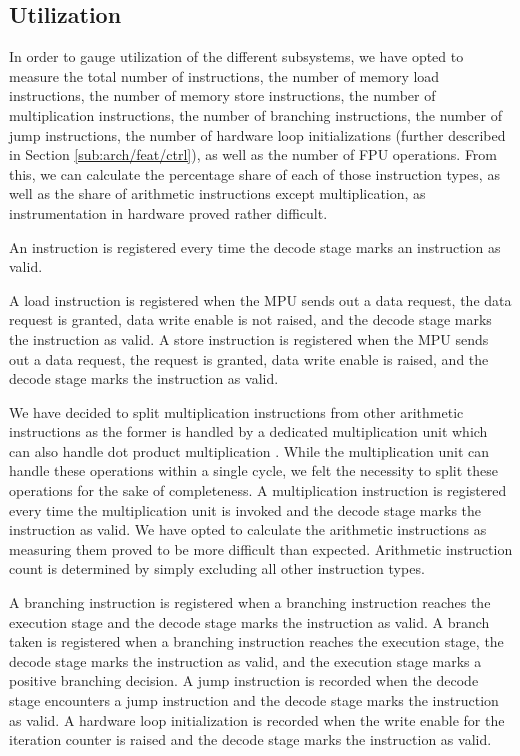\documentclass[../bachelor_paper.tex]{subfiles}
\begin{document}
\subsection{Utilization}
    \label{sub:arch/feat/ut}
In order to gauge utilization of the different subsystems, we have opted to measure the total number of instructions, the number of memory load instructions, the number of memory store instructions, the number of multiplication instructions, the number of branching instructions, the number of jump instructions, the number of hardware loop initializations (further described in Section \ref{sub:arch/feat/ctrl}), as well as the number of \ac{FPU} operations. From this, we can calculate the percentage share of each of those instruction types, as well as the share of arithmetic instructions except multiplication, as instrumentation in hardware proved rather difficult.

An instruction is registered every time the decode stage marks an instruction as valid.

A load instruction is registered when the \ac{MPU} sends out a data request, the data request is granted, data write enable is not raised, and the decode stage marks the instruction as valid. A store instruction is registered when the \ac{MPU} sends out a data request, the request is granted, data write enable is raised, and the decode stage marks the instruction as valid.

We have decided to split multiplication instructions from other arithmetic instructions as the former is handled by a dedicated multiplication unit which can also handle dot product multiplication \cite{gautschiNearThresholdRISCVCore2017}. While the multiplication unit can handle these operations within a single cycle, we felt the necessity to split these operations for the sake of completeness. A multiplication instruction is registered every time the multiplication unit is invoked and the decode stage marks the instruction as valid. We have opted to calculate the arithmetic instructions as measuring them proved to be more difficult than expected. Arithmetic instruction count is determined by simply excluding all other instruction types.

A branching instruction is registered when a branching instruction reaches the execution stage and the decode stage marks the instruction as valid. A branch taken is registered when a branching instruction reaches the execution stage, the decode stage marks the instruction as valid, and the execution stage marks a positive branching decision. A jump instruction is recorded when the decode stage encounters a jump instruction and the decode stage marks the instruction as valid. A hardware loop initialization is recorded when the write enable for the iteration counter is raised and the decode stage marks the instruction as valid. 
\end{document}
